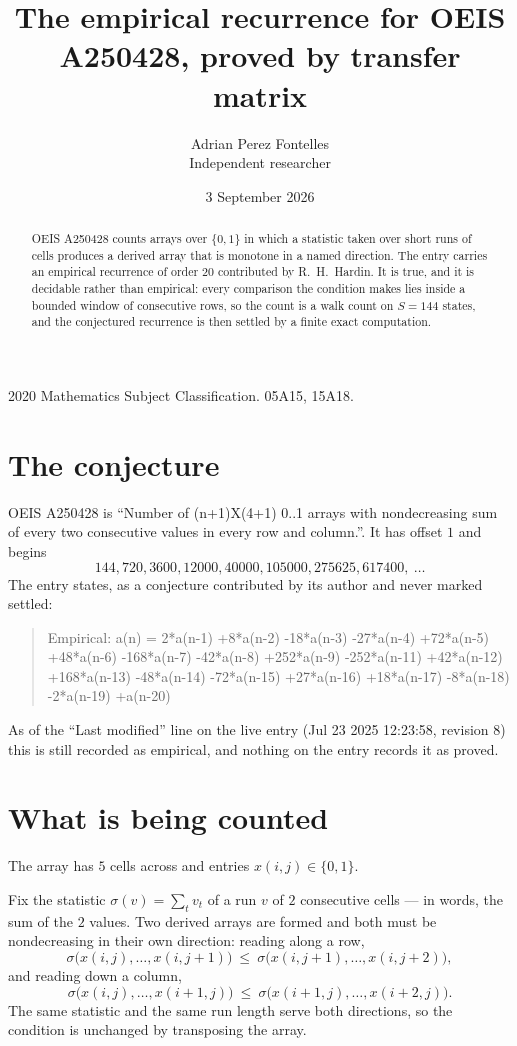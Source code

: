 \documentclass[11pt,a4paper]{article}
\title{The empirical recurrence for OEIS A250428, proved by transfer matrix}
\author{Adrian Perez Fontelles\\ \small Independent researcher}
\date{3 September 2026}
\theoremstyle{plain}
\theoremstyle{definition}
\begin{document}
\maketitle

\begin{abstract}
OEIS A250428 counts arrays over $\{0,1\}$ in which a statistic taken over short runs
of cells produces a derived array that is monotone in a named direction. The entry carries an
empirical recurrence of order $20$ contributed by R.~H.~Hardin. It is true, and it is
decidable rather than empirical: every comparison the condition makes lies inside a bounded
window of consecutive rows, so the count is a walk count on $S=144$ states, and the
conjectured recurrence is then settled by a finite exact computation.
\end{abstract}

\noindent\small 2020 Mathematics Subject Classification. 05A15, 15A18.\normalsize

\section{The conjecture}

OEIS A250428 is ``Number of (n+1)X(4+1) 0..1 arrays with nondecreasing sum of every two consecutive values in every row and column.''. It has offset $1$ and begins
\[
144, 720, 3600, 12000, 40000, 105000, 275625, 617400,\ \dots
\]
The entry states, as a conjecture contributed by its author and never marked settled:
\begin{quote}
Empirical: a(n) = 2*a(n-1) +8*a(n-2) -18*a(n-3) -27*a(n-4) +72*a(n-5) +48*a(n-6) -168*a(n-7) -42*a(n-8) +252*a(n-9) -252*a(n-11) +42*a(n-12) +168*a(n-13) -48*a(n-14) -72*a(n-15) +27*a(n-16) +18*a(n-17) -8*a(n-18) -2*a(n-19) +a(n-20)
\end{quote}
As of the ``Last modified'' line on the live entry (Jul 23 2025 12:23:58, revision 8) this is still
recorded as empirical, and nothing on the entry records it as proved.

\section{What is being counted}

The array has $5$ cells across and entries $x(i,j)\in\{0,1\}$.

Fix the statistic $\sigma(v)=\sum_{t} v_t$ of a run $v$ of $2$ consecutive cells --- in words,
the sum of the $2$ values. Two derived arrays are formed and both must be
nondecreasing in their own direction: reading along a row,
\[
\sigma\bigl(x(i,j),\dots,x(i,j{+}1)\bigr)\ \le\
\sigma\bigl(x(i,j{+}1),\dots,x(i,j{+}2)\bigr),
\]
and reading down a column,
\[
\sigma\bigl(x(i,j),\dots,x(i{+}1,j)\bigr)\ \le\
\sigma\bigl(x(i{+}1,j),\dots,x(i{+}2,j)\bigr).
\]
The same statistic and the same run length serve both directions, so the condition is
unchanged by transposing the array.
\end{document}
